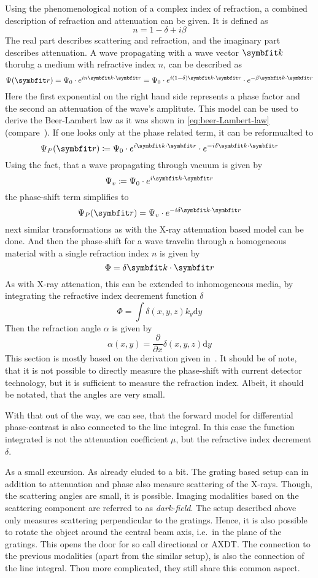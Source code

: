 Using the phenomenological notion of a complex index of refraction, a combined description of
refraction and attenuation can be given. It is defined as
\[ n = 1 - \delta + i \beta\]
The real part describes scattering and refraction, and the imaginary part describes attenuation.
A wave propagating with a wave vector \(\mvec{k}\) thoruhg a medium with refractive index \(n\), can
be described as
\[ \Psi(\mvec{r}) = \Psi_0 \cdot e^{i n \mvec{k} \cdot \mvec{r}} = \Psi_0 \cdot
	e^{i(1-\delta)\mvec{k} \cdot \mvec{r}} \cdot e^{-\beta \mvec{k} \cdot \mvec{r}}\]
Here the first exponential on the right hand side represents a phase factor and the second an
attenuation of the wave's amplitute. This model can be used to derive the Beer-Lambert law as it was
shown in \autoref{eq:beer-Lambert-law} (compare~\cite[Chapter~2.1]{hahn_statistical_2014}). If one
looks only at the phase related term, it can be reformualted to
\[ \Psi_P(\mvec{r}) \coloneq \Psi_0 \cdot e^{i \mvec{k} \cdot \mvec{r}} \cdot e^{-i\delta \mvec{k}
			\cdot \mvec{r}} \]
Using the fact, that a wave propagating through vacuum is given by
\[ \Psi_v \coloneq \Psi_0 \cdot e^{i \mvec{k} \cdot \mvec{r}} \]
the phase-shift term simplifies to
\[ \Psi_P(\mvec{r}) = \Psi_v \cdot e^{-i\delta \mvec{k} \cdot \mvec{r}} \]
next similar transformations as with the X-ray attenuation based model can be done. And then the
phase-shift for a wave travelin through a homogeneous material with a single refraction index \(n\)
is given by
\[ \Phi = \delta \mvec{k} \cdot \mvec{r} \]
As with X-ray attenation, this can be extended to inhomogeneous media, by integrating the refractive
index decrement function \(\delta\)
\[ \Phi = \int \delta(x, y, z) k_y \mathrm{d}y \]
Then the refraction angle \(\alpha\) is given by
\[ \alpha(x,y) = \frac{\partial}{\partial x} \delta(x, y, z) \mathrm{d}y \]
This section is mostly based on the derivation given in~\cite{hahn_statistical_2014}.
It should be of note, that it is not possible to directly measure the phase-shift with current
detector technology, but it is sufficient to measure the refraction index. Albeit, it should be
notated, that the angles are very small.

With that out of the way, we can see, that the forward model for differential phase-contrast is also
connected to the line integral. In this case the function integrated is not the attenuation
coefficient \(\mu\), but the refractive index decrement \(\delta\).

As a small excursion. As already eluded to a bit. The grating based setup can in addition to
attenuation and phase also measure scattering of the X-rays. Though, the scattering angles are
small, it is possible. Imaging modalities based on the scattering component are referred to as
\textit{dark-field}. The setup described above only measures scattering perpendicular to the
gratings. Hence, it is also possible to rotate the object around the central beam axis, i.e.\ in the
plane of the gratings. This opens the door for so call directional or \gls{AXDT}. The connection to
the previous modalities (apart from the similar setup), is also the connection of the line integral.
Thou more complicated, they still share this common aspect.

